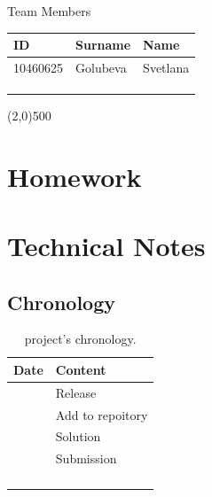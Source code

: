 \documentclass[a4paper,12pt,titlepage]{article} %
\begin{document}
\begin{titlepage}
\vspace{20pt}

\begin{center}
	{\large Team Members}
\end{center}
\begin{tabularx}{\textwidth}{|X|X|X|}
	\hline
	ID & Surname & Name\\
	\hline
	10460625 & Golubeva & Svetlana\\
	\hline
	 &  & \\
	\hline
	 &  & \\
	\hline
	 &  & \\
	\hline
\end{tabularx}

\vspace{\fill}
\begin{center}
	\line(2,0){500}
\end{center}

\end{titlepage}

\tableofcontents

\newpage
\listoftables

\listoffigures

\newpage
\section{Homework}

\newpage
\section{Technical Notes}

\subsection{Chronology}
\begin{longtable}{|c|p{13cm}|}
	\hline
	Date & Content\\
	\hline
	&  Release\\
	\hline
	&  Add to repoitory\\
	\hline
	&  Solution\\
	\hline
	&  Submission\\
	\hline
	&  \\
	\hline
	& \\
	\hline
	& \\
	\hline
	\caption{project's chronology.}
\end{longtable}
\end{document}
